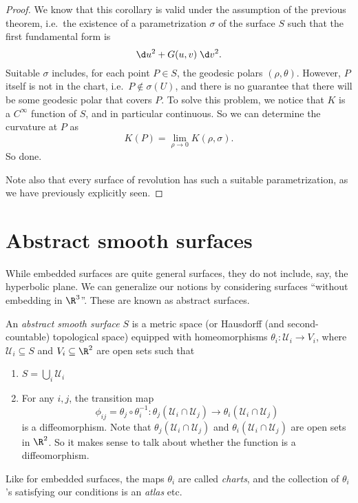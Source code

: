 \documentclass[a4paper]{article}
\begin{document}
\begin{proof}
  We know that this corollary is valid under the assumption of the previous theorem, i.e.\ the existence of a parametrization $\sigma$ of the surface $S$ such that the first fundamental form is
  \[
    \d u^2 + G(u, v) \;\d v^2.
  \]
  Suitable $\sigma$ includes, for each point $P \in S$, the geodesic polars $(\rho, \theta)$. However, $P$ itself is not in the chart, i.e.\ $P \not\in \sigma(U)$, and there is no guarantee that there will be some geodesic polar that covers $P$. To solve this problem, we notice that $K$ is a $C^\infty$ function of $S$, and in particular continuous. So we can determine the curvature at $P$ as
  \[
    K(P) = \lim_{\rho \to 0} K(\rho, \sigma).
  \]
  So done.

  Note also that every surface of revolution has such a suitable parametrization, as we have previously explicitly seen.
\end{proof}

\section{Abstract smooth surfaces}
While embedded surfaces are quite general surfaces, they do not include, say, the hyperbolic plane. We can generalize our notions by considering surfaces ``without embedding in $\R^3$''. These are known as abstract surfaces.
\begin{defi}
  An \emph{abstract smooth surface} $S$ is a metric space (or Hausdorff (and second-countable) topological space) equipped with homeomorphisms $\theta_i: \mathcal{U}_i \to V_i$, where $\mathcal{U}_i \subseteq S$ and $V_i \subseteq \R^2$ are open sets such that
  \begin{enumerate}
    \item $S = \bigcup_i \mathcal{U}_i$
    \item For any $i, j$, the transition map
      \[
        \phi_{ij} = \theta_j \circ \theta_i^{-1}: \theta_j(\mathcal{U}_i \cap \mathcal{U}_j) \to \theta_i(\mathcal{U}_i \cap \mathcal{U}_j)
      \]
      is a diffeomorphism. Note that $\theta_j(\mathcal{U}_i \cap \mathcal{U}_j)$ and $\theta_i (\mathcal{U}_i \cap \mathcal{U}_j)$ are open sets in $\R^2$. So it makes sense to talk about whether the function is a diffeomorphism.
  \end{enumerate}
\end{defi}
Like for embedded surfaces, the maps $\theta_i$ are called \emph{charts}, and the collection of $\theta_i$'s satisfying our conditions is an \emph{atlas} etc.
\end{document}
